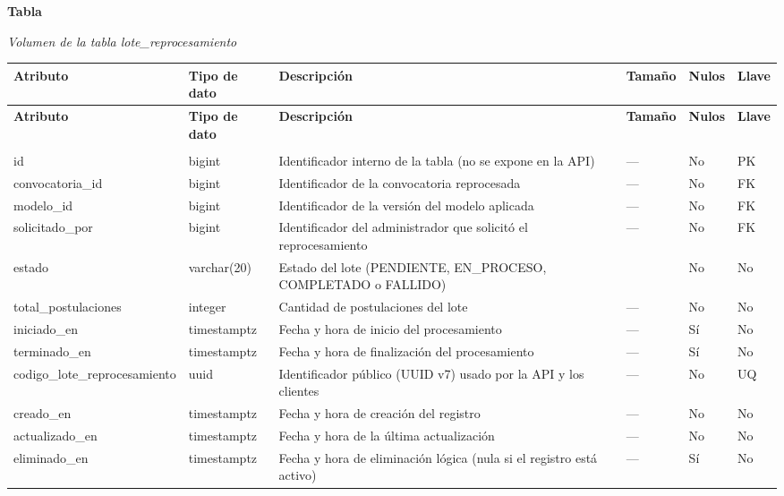 \label{tab:volumen_lote_reprocesamiento}
\noindent\textbf{Tabla~\thetable}\par\nopagebreak
\noindent\textit{Volumen de la tabla lote\_\allowbreak{}reprocesamiento}\par\nopagebreak
\begingroup\small\linespread{1}\selectfont\setlength{\tabcolsep}{4pt}
\begin{longtable}{>{\raggedright\arraybackslash}p{3.4cm} >{\raggedright\arraybackslash}p{2.5cm} >{\raggedright\arraybackslash}p{4.8cm} >{\centering\arraybackslash}p{1.6cm}>{\centering\arraybackslash}p{1.1cm} >{\centering\arraybackslash}p{1.3cm}}
\toprule
\textbf{Atributo} & \textbf{Tipo de dato} & \textbf{Descripción} & \textbf{Tamaño} & \textbf{Nulos} & \textbf{Llave} \\
\midrule
\endfirsthead
\toprule
\textbf{Atributo} & \textbf{Tipo de dato} & \textbf{Descripción} & \textbf{Tamaño} & \textbf{Nulos} & \textbf{Llave} \\
\midrule
\endhead
\endfoot
\bottomrule
\multicolumn{6}{l}{\textit{Nota.} Elaboración propia.} \\
\endlastfoot
id & bigint & Identificador interno de la tabla (no se expone en la API) & — & No & PK \\
convocatoria\_\allowbreak{}id & bigint & Identificador de la convocatoria reprocesada & — & No & FK \\
modelo\_\allowbreak{}id & bigint & Identificador de la versión del modelo aplicada & — & No & FK \\
solicitado\_\allowbreak{}por & bigint & Identificador del administrador que solicitó el reprocesamiento & — & No & FK \\
estado & varchar(20) & Estado del lote (PENDIENTE, EN\_\allowbreak{}PROCESO, COMPLETADO o FALLIDO) & 20 & No & No \\
total\_\allowbreak{}postulaciones & integer & Cantidad de postulaciones del lote & — & No & No \\
iniciado\_\allowbreak{}en & timestamptz & Fecha y hora de inicio del procesamiento & — & Sí & No \\
terminado\_\allowbreak{}en & timestamptz & Fecha y hora de finalización del procesamiento & — & Sí & No \\
codigo\_\allowbreak{}lote\_\allowbreak{}reprocesamiento & uuid & Identificador público (UUID v7) usado por la API y los clientes & — & No & UQ \\
creado\_\allowbreak{}en & timestamptz & Fecha y hora de creación del registro & — & No & No \\
actualizado\_\allowbreak{}en & timestamptz & Fecha y hora de la última actualización & — & No & No \\
eliminado\_\allowbreak{}en & timestamptz & Fecha y hora de eliminación lógica (nula si el registro está activo) & — & Sí & No \\
\end{longtable}
\endgroup
\addtocounter{table}{-1}


